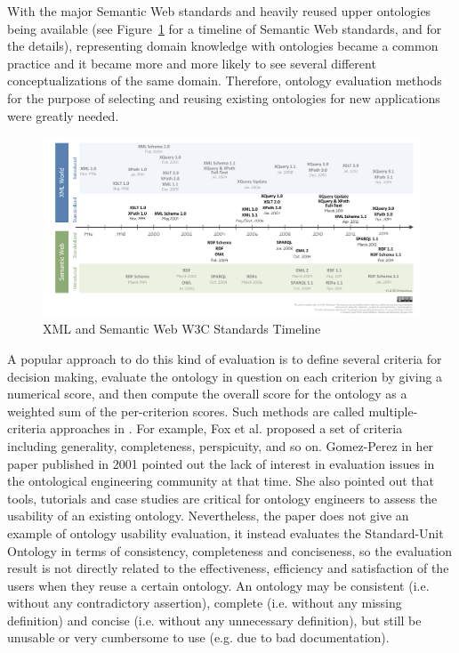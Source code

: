 With the major Semantic Web standards and heavily reused upper ontologies being available (see Figure~\ref{fig:timeline} for a timeline of Semantic Web standards, and \cite{bikakis2013xml} for the details), representing domain knowledge with ontologies became a common practice and it became more and more likely to see several different conceptualizations of the same domain. Therefore, ontology evaluation methods for the purpose of selecting and reusing existing ontologies for new applications were greatly needed.

\begin{figure}
	\centering
	\includegraphics[width=\linewidth]{XMLSemanticWebW3CTimeline}
	\caption[XML and Semantic Web W3C Standards Timeline]{XML and Semantic Web W3C Standards Timeline}
	\label{fig:timeline}
\end{figure}

A popular approach to do this kind of evaluation is to define several criteria for decision making, evaluate the ontology in question on each criterion by giving a numerical score, and then compute the overall score for the ontology as a weighted sum of the per-criterion scores. Such methods are called multiple-criteria approaches in \cite{brank2005survey}. For example, Fox et al. \cite{fox1995organisation} proposed a set of criteria including generality, completeness, perspicuity, and so on. Gomez-Perez in her paper \cite{gomez2001evaluation} published in 2001 pointed out the lack of interest in evaluation issues in the ontological engineering community at that time. She also pointed out that tools, tutorials and case studies are critical for ontology engineers to assess the usability of an existing ontology. Nevertheless, the paper does not give an example of ontology usability evaluation, it instead evaluates the Standard-Unit Ontology in terms of consistency, completeness and conciseness, so the evaluation result is not directly related to the effectiveness, efficiency and satisfaction of the users when they reuse a certain ontology. An ontology may be consistent (i.e. without any contradictory assertion), complete (i.e. without any missing definition) and concise (i.e. without any unnecessary definition), but still be unusable or very cumbersome to use (e.g. due to bad documentation).


